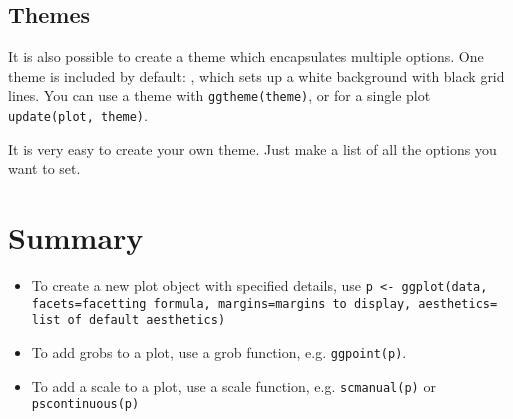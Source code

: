 \subsection{Themes}\label{sub:themes}

It is also possible to create a theme which encapsulates multiple options.  One theme is included by default: {\tt }, which sets up a white background with black grid lines.  You can use a theme with {\tt ggtheme(theme)}, or for a single plot {\tt update(plot, theme)}.

It is very easy to create your own theme.  Just make a list of all the options you want to set.

\section{Summary}\label{sec:summary}

\begin{itemize}
  \item To create a new plot object with specified details, use {\tt p <- ggplot(data, facets=facetting formula, margins=margins to display, aesthetics= list of default aesthetics)}
  \item To add grobs to a plot, use a grob function, e.g. {\tt ggpoint(p)}.  
  \item To add a scale to a plot, use a scale function, e.g. {\tt scmanual(p)} or {\tt pscontinuous(p)}
\end{itemize}




